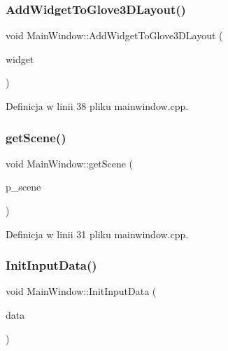 \mbox{\label{class_main_window_ad1878f043e440b2917d12ed59caaca0c}} 
\subsubsection{\texorpdfstring{Add\+Widget\+To\+Glove3\+D\+Layout()}{AddWidgetToGlove3DLayout()}}
{\footnotesize\ttfamily void Main\+Window\+::\+Add\+Widget\+To\+Glove3\+D\+Layout (\begin{DoxyParamCaption}\item[{Q\+Widget $\ast$}]{widget }\end{DoxyParamCaption})}



Definicja w linii 38 pliku mainwindow.\+cpp.

\mbox{\label{class_main_window_ab82b9864da7ab88d14388796c706b1d6}} 
\subsubsection{\texorpdfstring{get\+Scene()}{getScene()}}
{\footnotesize\ttfamily void Main\+Window\+::get\+Scene (\begin{DoxyParamCaption}\item[{\hyperlink{class_scene}{Scene} $\ast$}]{p\+\_\+scene }\end{DoxyParamCaption})}



Definicja w linii 31 pliku mainwindow.\+cpp.

\mbox{\label{class_main_window_abd0772bfb398165834c0693627603b0f}} 
\subsubsection{\texorpdfstring{Init\+Input\+Data()}{InitInputData()}}
{\footnotesize\ttfamily void Main\+Window\+::\+Init\+Input\+Data (\begin{DoxyParamCaption}\item[{\hyperlink{class_input}{Input} $\ast$}]{data }\end{DoxyParamCaption})}



